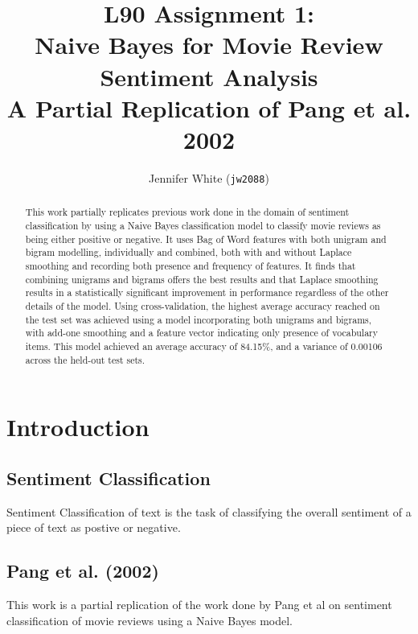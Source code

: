 \documentclass[twocolumn]{article}
\title{ L90 Assignment 1:\\
	Naive Bayes for Movie Review Sentiment Analysis \\
	\large A Partial Replication of Pang et al. 2002 }
\author{Jennifer White (\texttt{jw2088})}
\begin{document}
\maketitle
\begin{abstract}
This work partially replicates previous work done in the domain of sentiment classification by using a Naive Bayes classification model to classify movie reviews as being either positive or negative. It uses Bag of Word features with both unigram and bigram modelling, individually and combined, both with and without Laplace smoothing and recording both presence and frequency of features. It finds that combining unigrams and bigrams offers the best results and that Laplace smoothing results in a statistically significant improvement in performance regardless of the other details of the model. Using cross-validation, the highest average accuracy reached on the test set was achieved using a model incorporating both unigrams and bigrams, with add-one smoothing and a feature vector indicating only presence of vocabulary items. This model achieved an average accuracy of 84.15\%, and a variance of 0.00106 across the held-out test sets. 
\end{abstract}

\section{Introduction}

\subsection{Sentiment Classification}

Sentiment Classification of text is the task of classifying the overall sentiment of a piece of text as postive or negative.

\subsection{Pang et al. (2002)}

This work is a partial replication of the work done by Pang et al \cite{pang} on sentiment classification of movie reviews using a Naive Bayes model. 
\end{document}
